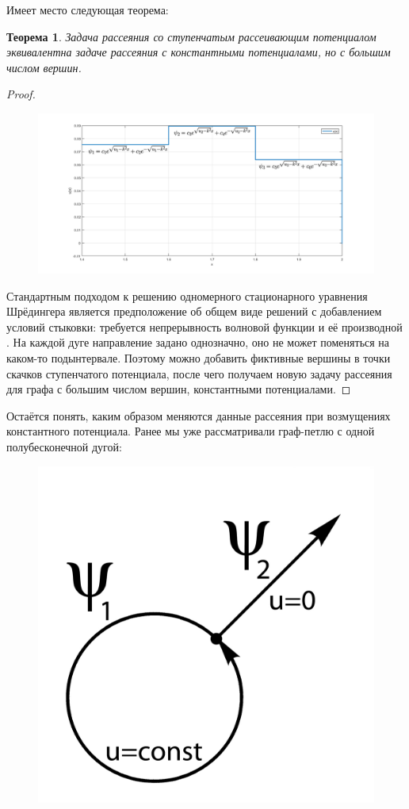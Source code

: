 \documentclass[a4 paper, 12 pt]{extarticle}
\newtheorem{theorem}{Теорема}[section]
\begin{document}
   Имеет место следующая теорема:
   \begin{theorem}
   	Задача рассеяния со ступенчатым рассеивающим потенциалом эквивалентна задаче рассеяния с константными потенциалами, но с большим числом вершин.
   \end{theorem}
   \begin{proof}
   	\begin{figure}[!htb]
   		\centering
   		\includegraphics[scale=0.5]{step.png}
   	\end{figure}
   	Стандартным подходом к решению одномерного стационарного уравнения Шрёдингера является предположение об общем виде решений с добавлением условий стыковки: требуется непрерывность волновой функции и её производной \cite{Peisakhovich}. На каждой дуге направление задано однозначно, оно не может поменяться на каком-то подынтервале. Поэтому можно добавить фиктивные вершины в точки скачков ступенчатого потенциала, после чего получаем новую задачу рассеяния для графа с большим числом вершин, константными потенциалами. 
   \end{proof}
      
   Остаётся понять, каким образом меняются данные рассеяния при возмущениях константного потенциала.
   Ранее мы уже рассматривали граф-петлю с одной полубесконечной дугой:
   \begin{figure}[!htb]
   	\centering
   	\includegraphics[scale=0.5]{one-arrow.jpg}
   \end{figure}
\end{document}
